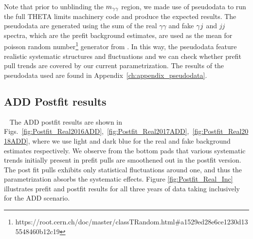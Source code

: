 Note that prior to unblinding the $m_{\gamma\gamma}$ region, we made use of pseudodata to run the full \textrm{THETA} limits machinery code and produce the expected results. The pseudodata are generated using the sum of the real $\gamma\gamma$ and fake $\gamma j$ and $jj$ spectra, which are the prefit background estimates, are used as the mean for poisson random number\footnote{https://root.cern.ch/doc/master/classTRandom.html#a1529ed28e6ce1230d135548460b12c19} generator from \ROOT. In this way, the pseudodata feature realistic systematic structures and fluctuations and we can check whether prefit pull trends are covered by our current parametrization. The results of the pseudodata used are found in Appendix~\ref{ch:appendix_pseudodata}.

\subsection{ADD Postfit results}~\label{sec:ADDPostfits}
 The ADD postfit results are shown in Figs.~\ref{fig:Postfit_Real2016ADD},~\ref{fig:Postfit_Real2017ADD},~\ref{fig:Postfit_Real2018ADD}, where we use light and dark blue for the real and fake background estimates respectively.
We observe from the bottom pads that various systematic trends initially present in prefit pulls are smoothened out in the postfit version. The post fit pulls exhibits only statistical fluctuations around one, and thus the \mgg parametrization absorbs the systematic effects. Figure \ref{fig:Postfit_Real_Inc} illustrates prefit and postfit results for all three years of data taking inclusively for the ADD scenario.

